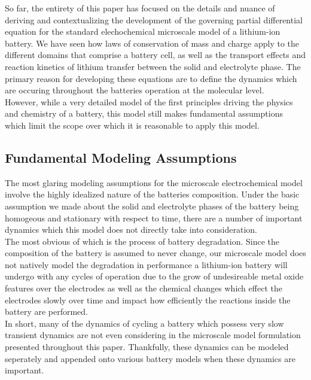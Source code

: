 \documentclass[lettersize,journal]{IEEEtran}
\begin{document}
So far, the entirety of this paper has focused on the details and nuance of deriving and contextualizing the development of the governing partial differential equation for the standard elechochemical microscale model of a lithium-ion battery. We have seen how laws of conservation of mass and charge apply to the different domains that comprise a battery cell, as well as the transport effects and reaction kinetics of lithium transfer between the solid and electrolyte phase. The primary reason for developing these equations are to define the dynamics which are occuring throughout the batteries operation at the molecular level. \\

However, while a very detailed model of the first principles driving the physics and chemistry of a battery, this model still makes fundamental assumptions which limit the scope over which it is reasonable to apply this model.
\subsection{Fundamental Modeling Assumptions}

The most glaring modeling assumptions for the microscale electrochemical model involve the highly idealized nature of the batteries composition. Under the basic assumption we made about the solid and electrolyte phases of the battery being homogeous and stationary with respect to time, there are a number of important dynamics which this model does not directly take into consideration. \\

The most obvious of which is the process of battery degradation. Since the composition of the battery is assumed to never change, our microscale model does not natively model the degradation in performance a lithium-ion battery will undergo with any cycles of operation due to the grow of undesireable metal oxide features over the electrodes as well as the chemical changes which effect the electrodes slowly over time and impact how efficiently the reactions inside the battery are performed. \\

In short, many of the dynamics of cycling a battery which possess very slow transient dynamics are not even considering in the microscale model formulation presented throughout this paper. Thankfully, these dynamics can be modeled seperately and appended onto various battery models when these dynamics are important.
\end{document}
